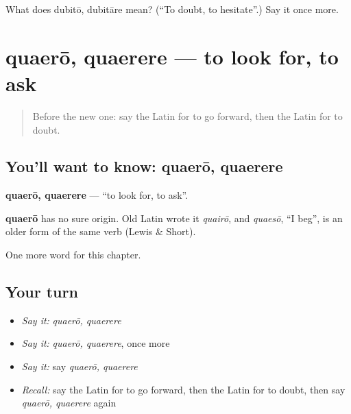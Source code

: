 \begin{tcolorbox}[breakable,colback=teal!4,colframe=teal!35!black,title={Before you move on}]
What does dubitō, dubitāre mean? (\textquotedblleft{}To doubt, to hesitate\textquotedblright{}.) Say it once more.
\end{tcolorbox}
\section[quaerō, quaerere]{quaerō, quaerere — to look for, to ask}

\label{lesson:LA-C203-quaero}



\begin{quote}
Before the new one: say the Latin for to go forward, then the Latin for to doubt.
\end{quote}

\subsection*{You'll want to know: quaerō, quaerere}
\textbf{quaerō, quaerere} — \textquotedblleft{}to look for, to ask\textquotedblright{}.

\begin{cousinweb}
\textbf{quaerō} has no sure origin. Old Latin wrote it \emph{quairō}, and \emph{quaesō}, \textquotedblleft{}I beg\textquotedblright{}, is an older form of the same verb (Lewis \& Short).
\end{cousinweb}

\begin{grammarlens}[title={What you've built}]
One more word for this chapter.
\end{grammarlens}

\subsection*{Your turn}
\begin{itemize}
\raggedright
  \item \emph{Say it:} \emph{quaerō, quaerere}
  \item \emph{Say it:} \emph{quaerō, quaerere}, once more
  \item \emph{Say it:} say \emph{quaerō, quaerere}
  \item \emph{Recall:} say the Latin for to go forward, then the Latin for to doubt, then say \emph{quaerō, quaerere} again
\end{itemize}

